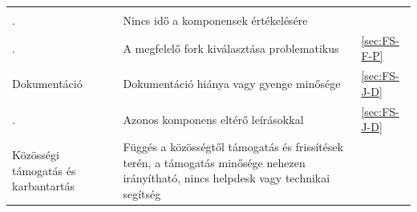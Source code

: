 \documentclass[12pt,magyar,a4paper,oneside]{scrreprt}
\begin{document}
\begin{longtable}[]{@{}lll@{}}
\begin{minipage}[t]{0.18\columnwidth}
\strut
\end{minipage}\tabularnewline
\begin{minipage}[t]{0.24\columnwidth}\raggedright
.\strut
\end{minipage} & \begin{minipage}[t]{0.49\columnwidth}\raggedright
Nincs idő a komponensek értékelésére\strut
\end{minipage} & \begin{minipage}[t]{0.18\columnwidth}\raggedright
\strut
\end{minipage}\tabularnewline
\begin{minipage}[t]{0.24\columnwidth}\raggedright
.\strut
\end{minipage} & \begin{minipage}[t]{0.49\columnwidth}\raggedright
A megfelelő fork kiválasztása problematikus\strut
\end{minipage} & \begin{minipage}[t]{0.18\columnwidth}\raggedright
\ref{sec:FS-F-P}\strut
\end{minipage}\tabularnewline
\begin{minipage}[t]{0.24\columnwidth}\raggedright
Dokumentáció\strut
\end{minipage} & \begin{minipage}[t]{0.49\columnwidth}\raggedright
Dokumentáció hiánya vagy gyenge minősége\strut
\end{minipage} & \begin{minipage}[t]{0.18\columnwidth}\raggedright
\ref{sec:FS-J-D}\strut
\end{minipage}\tabularnewline
\begin{minipage}[t]{0.24\columnwidth}\raggedright
.\strut
\end{minipage} & \begin{minipage}[t]{0.49\columnwidth}\raggedright
Azonos komponens eltérő leírásokkal\strut
\end{minipage} & \begin{minipage}[t]{0.18\columnwidth}\raggedright
\ref{sec:FS-J-D}\strut
\end{minipage}\tabularnewline
\begin{minipage}[t]{0.24\columnwidth}\raggedright
Közösségi támogatás és karbantartás\strut
\end{minipage} & \begin{minipage}[t]{0.49\columnwidth}\raggedright
Függés a közösségtől támogatás és frissítések terén, a támogatás
minősége nehezen irányítható, nincs helpdesk vagy technikai
segítség\strut

\end{minipage}
\end{longtable}
\end{document}
